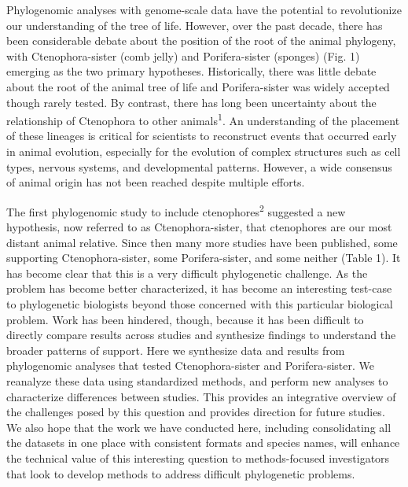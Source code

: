\documentclass[]{article}
\begin{document}
Phylogenomic analyses with genome-scale data have the potential to
revolutionize our understanding of the tree of life. However, over the
past decade, there has been considerable debate about the position of
the root of the animal phylogeny, with Ctenophora-sister (comb jelly)
and Porifera-sister (sponges) (Fig. 1) emerging as the two primary
hypotheses. Historically, there was little debate about the root of the
animal tree of life and Porifera-sister was widely accepted though
rarely tested. By contrast, there has long been uncertainty about the
relationship of Ctenophora to other animals\textsuperscript{1}. An
understanding of the placement of these lineages is critical for
scientists to reconstruct events that occurred early in animal
evolution, especially for the evolution of complex structures such as
cell types, nervous systems, and developmental patterns. However, a wide
consensus of animal origin has not been reached despite multiple
efforts.

The first phylogenomic study to include ctenophores\textsuperscript{2}
suggested a new hypothesis, now referred to as Ctenophora-sister, that
ctenophores are our most distant animal relative. Since then many more
studies have been published, some supporting Ctenophora-sister, some
Porifera-sister, and some neither (Table 1). It has become clear that
this is a very difficult phylogenetic challenge. As the problem has
become better characterized, it has become an interesting test-case to
phylogenetic biologists beyond those concerned with this particular
biological problem. Work has been hindered, though, because it has been
difficult to directly compare results across studies and synthesize
findings to understand the broader patterns of support. Here we
synthesize data and results from phylogenomic analyses that tested
Ctenophora-sister and Porifera-sister. We reanalyze these data using
standardized methods, and perform new analyses to characterize
differences between studies. This provides an integrative overview of
the challenges posed by this question and provides direction for future
studies. We also hope that the work we have conducted here, including
consolidating all the datasets in one place with consistent formats and
species names, will enhance the technical value of this interesting
question to methods-focused investigators that look to develop methods
to address difficult phylogenetic problems.
\end{document}
